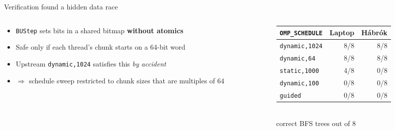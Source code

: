 \documentclass[aspectratio=169,11pt]{beamer}
\begin{document}
\begin{frame}{Verification found a hidden data race}
  \begin{columns}[c]
    \begin{column}{0.55\textwidth}
      \begin{itemize}\setlength{\itemsep}{5pt}
        \item \texttt{BUStep} sets bits in a shared bitmap \textbf{without atomics}
        \item Safe only if each thread's chunk starts on a 64-bit word
        \item Upstream \texttt{dynamic,1024} satisfies this \emph{by accident}
        \item $\Rightarrow$ schedule sweep restricted to chunk sizes that are multiples of 64
      \end{itemize}
    \end{column}
    \begin{column}{0.4\textwidth}
      \centering\small
      \begin{tabular}{@{}lrr@{}}
        \toprule
        \texttt{OMP\_SCHEDULE} & Laptop & Hábrók \\
        \midrule
        \texttt{dynamic,1024} & 8/8 & 8/8 \\
        \texttt{dynamic,64} & 8/8 & 8/8 \\
        \texttt{static,1000} & \alert{4/8} & \alert{0/8} \\
        \texttt{dynamic,100} & \alert{0/8} & \alert{0/8} \\
        \texttt{guided} & \alert{0/8} & \alert{0/8} \\
        \bottomrule
      \end{tabular}\\[2pt]
      {\scriptsize correct BFS trees out of 8}
    \end{column}
  \end{columns}
\end{frame}
\end{document}
